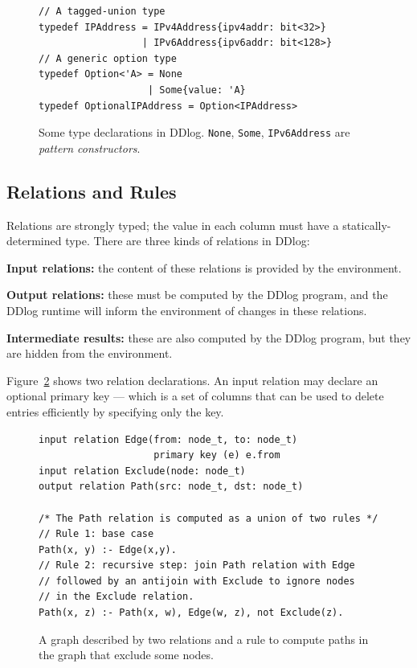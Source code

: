 \begin{figure}[t]
  \footnotesize
\begin{lstlisting}[language=ddlog]
// A tagged-union type
typedef IPAddress = IPv4Address{ipv4addr: bit<32>}
                  | IPv6Address{ipv6addr: bit<128>}
// A generic option type
typedef Option<'A> = None
                   | Some{value: 'A}
typedef OptionalIPAddress = Option<IPAddress>
\end{lstlisting}
\caption{Some type declarations in DDlog.  \texttt{None}, \texttt{Some},
\texttt{IPv6Address} are \emph{pattern constructors}.\label{fig:types}}
\end{figure}

\subsection{Relations and Rules}

Relations are strongly typed; the value in each column must have a
statically-determined type.  There are three kinds of relations in
DDlog:

\noindent \textbf{Input relations:} the content of these relations is provided by
the environment.

\noindent \textbf{Output relations:} these must be computed by the DDlog
program, and the DDlog runtime will inform the environment of changes
in these relations.

\noindent \textbf{Intermediate results:} these are also computed by
the DDlog program, but they are hidden from the environment.

Figure~\ref{fig:relations-rules} shows two relation declarations.  An
input relation may declare an optional primary key --- which is a set
of columns that can be used to delete entries efficiently by
specifying only the key.

\begin{figure}[t]
  \small
  \begin{lstlisting}[language=ddlog]
input relation Edge(from: node_t, to: node_t)
                    primary key (e) e.from
input relation Exclude(node: node_t)
output relation Path(src: node_t, dst: node_t)

/* The Path relation is computed as a union of two rules */
// Rule 1: base case
Path(x, y) :- Edge(x,y).
// Rule 2: recursive step: join Path relation with Edge
// followed by an antijoin with Exclude to ignore nodes
// in the Exclude relation.
Path(x, z) :- Path(x, w), Edge(w, z), not Exclude(z).
  \end{lstlisting}
  \caption{A graph described by two relations and a rule to compute
    paths in the graph that exclude some nodes.\label{fig:relations-rules}}
\end{figure}

